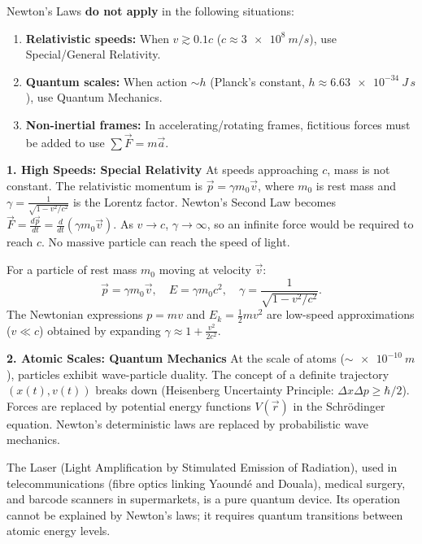 \documentclass[11pt]{article}
\newcommand{\cle}[1]{{\popxbold\color{popdark}#1}}
\begin{document}
\begin{attention}
Newton's Laws \textbf{do not apply} in the following situations:
\begin{enumerate}
    \item \textbf{Relativistic speeds:} When $v \gtrsim 0.1c$ ($c \approx \SI{3e8}{m/s}$), use Special/General Relativity.
    \item \textbf{Quantum scales:} When action $\sim h$ (Planck's constant, $h \approx \SI{6.63e-34}{J\,s}$), use Quantum Mechanics.
    \item \textbf{Non-inertial frames:} In accelerating/rotating frames, fictitious forces must be added to use $\sum \vec{F} = m\vec{a}$.
\end{enumerate}
\end{attention}

\textbf{1. High Speeds: Special Relativity}
At speeds approaching $c$, mass is not constant. The relativistic momentum is $\vec{p} = \gamma m_0 \vec{v}$, where $m_0$ is rest mass and $\gamma = \frac{1}{\sqrt{1 - v^2/c^2}}$ is the \cle{Lorentz factor}. Newton's Second Law becomes $\vec{F} = \frac{d\vec{p}}{dt} = \frac{d}{dt}(\gamma m_0 \vec{v})$. As $v \to c$, $\gamma \to \infty$, so an infinite force would be required to reach $c$. No massive particle can reach the speed of light.

\begin{propriete}
For a particle of rest mass $m_0$ moving at velocity $\vec{v}$:
\[
\vec{p} = \gamma m_0 \vec{v}, \quad E = \gamma m_0 c^2, \quad \gamma = \frac{1}{\sqrt{1 - v^2/c^2}}.
\]
The Newtonian expressions $p = mv$ and $E_k = \frac{1}{2}mv^2$ are low-speed approximations ($v \ll c$) obtained by expanding $\gamma \approx 1 + \frac{v^2}{2c^2}$.
\end{propriete}

\textbf{2. Atomic Scales: Quantum Mechanics}
At the scale of atoms ($\sim \SI{e-10}{m}$), particles exhibit \cle{wave-particle duality}. The concept of a definite trajectory $(x(t), v(t))$ breaks down (Heisenberg Uncertainty Principle: $\Delta x \Delta p \ge \hbar/2$). Forces are replaced by potential energy functions $V(\vec{r})$ in the Schrödinger equation. Newton's deterministic laws are replaced by probabilistic wave mechanics.

\begin{savaistu}
The \cle{Laser} (Light Amplification by Stimulated Emission of Radiation), used in telecommunications (fibre optics linking Yaoundé and Douala), medical surgery, and barcode scanners in supermarkets, is a pure quantum device. Its operation cannot be explained by Newton's laws; it requires quantum transitions between atomic energy levels.
\end{savaistu}
\end{document}
